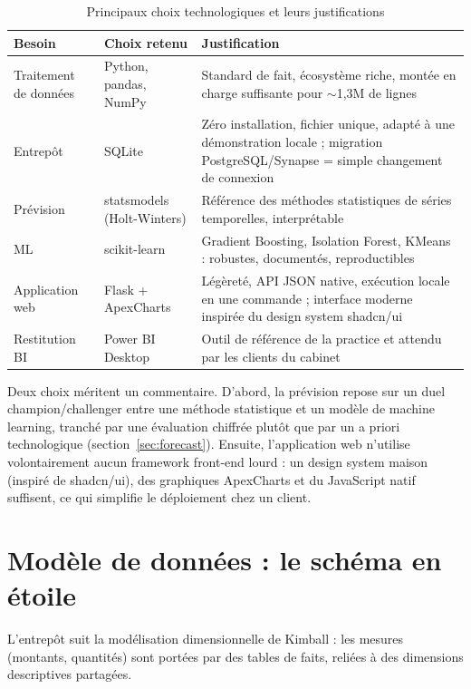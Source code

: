 \documentclass[12pt,a4paper]{report}
\begin{document}
\begin{table}[htbp]
  \centering
  \small
  \begin{tabular}{@{}lp{4.1cm}p{6.2cm}@{}}
    \toprule
    \textbf{Besoin} & \textbf{Choix retenu} & \textbf{Justification} \\
    \midrule
    Traitement de données & Python, pandas, NumPy &
      Standard de fait, écosystème riche, montée en charge suffisante pour
      $\sim$1,3M de lignes \\
    Entrepôt & SQLite &
      Zéro installation, fichier unique, adapté à une démonstration locale ;
      migration PostgreSQL/Synapse = simple changement de connexion \\
    Prévision & statsmodels (Holt-Winters) &
      Référence des méthodes statistiques de séries temporelles,
      interprétable \\
    ML & scikit-learn &
      Gradient Boosting, Isolation Forest, KMeans : robustes, documentés,
      reproductibles \\
    Application web & Flask + ApexCharts &
      Légèreté, API JSON native, exécution locale en une commande ;
      interface moderne inspirée du design system shadcn/ui \\
    Restitution BI & Power BI Desktop &
      Outil de référence de la practice et attendu par les clients du
      cabinet \\
    \bottomrule
  \end{tabular}
  \caption{Principaux choix technologiques et leurs justifications}
  \label{tab:choix-techno}
\end{table}

Deux choix méritent un commentaire. D'abord, la prévision repose sur un duel
\og champion/challenger \fg{} entre une méthode statistique et un modèle de
machine learning, tranché par une évaluation chiffrée plutôt que par un a
priori technologique (section~\ref{sec:forecast}). Ensuite, l'application web
n'utilise volontairement aucun framework front-end lourd : un design system
maison (inspiré de shadcn/ui), des graphiques ApexCharts et du JavaScript
natif suffisent, ce qui simplifie le déploiement chez un client.

\section{Modèle de données : le schéma en étoile}

L'entrepôt suit la modélisation dimensionnelle de Kimball : les mesures
(montants, quantités) sont portées par des tables de faits, reliées à des
dimensions descriptives partagées.
\end{document}
